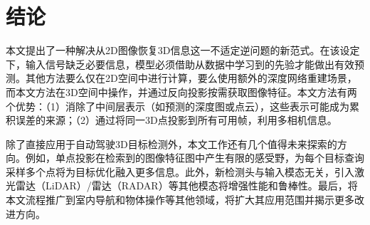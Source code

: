 \section{结论}

本文提出了一种解决从2D图像恢复3D信息这一不适定逆问题的新范式。在该设定下，输入信号缺乏必要信息，模型必须借助从数据中学习到的先验才能做出有效预测。其他方法要么仅在2D空间中进行计算，要么使用额外的深度网络重建场景，而本文方法在3D空间中操作，并通过反向投影按需获取图像特征。本文方法有两个优势：（1）消除了中间层表示（如预测的深度图或点云），这些表示可能成为累积误差的来源；（2）通过将同一3D点投影到所有可用帧，利用多相机信息。

除了直接应用于自动驾驶3D目标检测外，本文工作还有几个值得未来探索的方向。例如，单点投影在检索到的图像特征图中产生有限的感受野，为每个目标查询采样多个点将为目标优化融入更多信息。此外，新检测头与输入模态无关，引入激光雷达（LiDAR）/雷达（RADAR）等其他模态将增强性能和鲁棒性。最后，将本文流程推广到室内导航和物体操作等其他领域，将扩大其应用范围并揭示更多改进方向。 